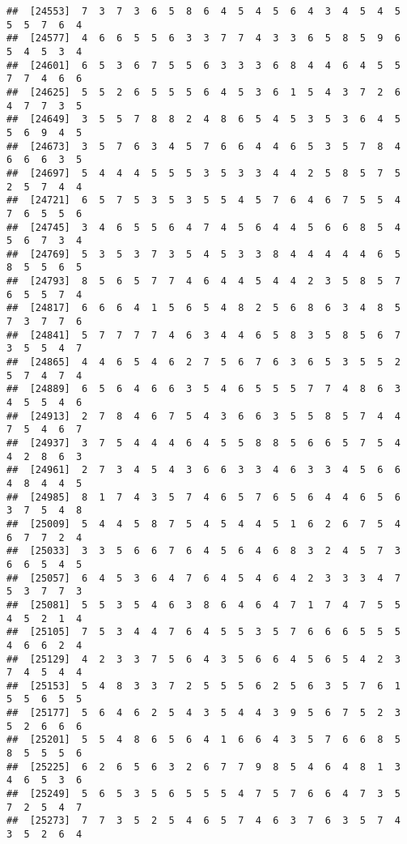 \documentclass[
]{book}
\begin{document}
\begin{verbatim}
##  [24553]  7  3  7  3  6  5  8  6  4  5  4  5  6  4  3  4  5  4  5  5  5  7  6  4
##  [24577]  4  6  6  5  5  6  3  3  7  7  4  3  3  6  5  8  5  9  6  5  4  5  3  4
##  [24601]  6  5  3  6  7  5  5  6  3  3  3  6  8  4  4  6  4  5  5  7  7  4  6  6
##  [24625]  5  5  2  6  5  5  5  6  4  5  3  6  1  5  4  3  7  2  6  4  7  7  3  5
##  [24649]  3  5  5  7  8  8  2  4  8  6  5  4  5  3  5  3  6  4  5  5  6  9  4  5
##  [24673]  3  5  7  6  3  4  5  7  6  6  4  4  6  5  3  5  7  8  4  6  6  6  3  5
##  [24697]  5  4  4  4  5  5  5  3  5  3  3  4  4  2  5  8  5  7  5  2  5  7  4  4
##  [24721]  6  5  7  5  3  5  3  5  5  4  5  7  6  4  6  7  5  5  4  7  6  5  5  6
##  [24745]  3  4  6  5  5  6  4  7  4  5  6  4  4  5  6  6  8  5  4  5  6  7  3  4
##  [24769]  5  3  5  3  7  3  5  4  5  3  3  8  4  4  4  4  4  6  5  8  5  5  6  5
##  [24793]  8  5  6  5  7  7  4  6  4  4  5  4  4  2  3  5  8  5  7  6  5  5  7  4
##  [24817]  6  6  6  4  1  5  6  5  4  8  2  5  6  8  6  3  4  8  5  7  3  7  7  6
##  [24841]  5  7  7  7  7  4  6  3  4  4  6  5  8  3  5  8  5  6  7  3  5  5  4  7
##  [24865]  4  4  6  5  4  6  2  7  5  6  7  6  3  6  5  3  5  5  2  5  7  4  7  4
##  [24889]  6  5  6  4  6  6  3  5  4  6  5  5  5  7  7  4  8  6  3  4  5  5  4  6
##  [24913]  2  7  8  4  6  7  5  4  3  6  6  3  5  5  8  5  7  4  4  7  5  4  6  7
##  [24937]  3  7  5  4  4  4  6  4  5  5  8  8  5  6  6  5  7  5  4  4  2  8  6  3
##  [24961]  2  7  3  4  5  4  3  6  6  3  3  4  6  3  3  4  5  6  6  4  8  4  4  5
##  [24985]  8  1  7  4  3  5  7  4  6  5  7  6  5  6  4  4  6  5  6  3  7  5  4  8
##  [25009]  5  4  4  5  8  7  5  4  5  4  4  5  1  6  2  6  7  5  4  6  7  7  2  4
##  [25033]  3  3  5  6  6  7  6  4  5  6  4  6  8  3  2  4  5  7  3  6  6  5  4  5
##  [25057]  6  4  5  3  6  4  7  6  4  5  4  6  4  2  3  3  3  4  7  5  3  7  7  3
##  [25081]  5  5  3  5  4  6  3  8  6  4  6  4  7  1  7  4  7  5  5  4  5  2  1  4
##  [25105]  7  5  3  4  4  7  6  4  5  5  3  5  7  6  6  6  5  5  5  4  6  6  2  4
##  [25129]  4  2  3  3  7  5  6  4  3  5  6  6  4  5  6  5  4  2  3  7  4  5  4  4
##  [25153]  5  4  8  3  3  7  2  5  5  5  6  2  5  6  3  5  7  6  1  5  5  6  5  5
##  [25177]  5  6  4  6  2  5  4  3  5  4  4  3  9  5  6  7  5  2  3  5  2  6  6  6
##  [25201]  5  5  4  8  6  5  6  4  1  6  6  4  3  5  7  6  6  8  5  8  5  5  5  6
##  [25225]  6  2  6  5  6  3  2  6  7  7  9  8  5  4  6  4  8  1  3  4  6  5  3  6
##  [25249]  5  6  5  3  5  6  5  5  5  4  7  5  7  6  6  4  7  3  5  7  2  5  4  7
##  [25273]  7  7  3  5  2  5  4  6  5  7  4  6  3  7  6  3  5  7  4  3  5  2  6  4

\end{verbatim}
\end{document}
